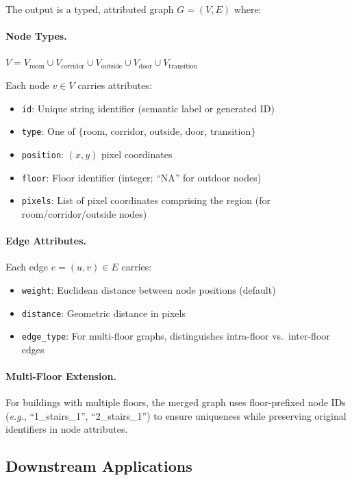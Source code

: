 \documentclass[manuscript,screen,review]{acmart}
\newcommand{\eg}{\textit{e.g.}}
\begin{document}
The output is a typed, attributed graph $G = (V, E)$ where:

\paragraph{Node Types.} $V = V_{\text{room}} \cup V_{\text{corridor}} \cup V_{\text{outside}} \cup V_{\text{door}} \cup V_{\text{transition}}$

Each node $v \in V$ carries attributes:
\begin{itemize}
    \item \texttt{id}: Unique string identifier (semantic label or generated ID)
    \item \texttt{type}: One of $\{$room, corridor, outside, door, transition$\}$
    \item \texttt{position}: $(x, y)$ pixel coordinates
    \item \texttt{floor}: Floor identifier (integer; ``NA'' for outdoor nodes)
    \item \texttt{pixels}: List of pixel coordinates comprising the region (for room/corridor/outside nodes)
\end{itemize}

\paragraph{Edge Attributes.} Each edge $e = (u, v) \in E$ carries:
\begin{itemize}
    \item \texttt{weight}: Euclidean distance between node positions (default)
    \item \texttt{distance}: Geometric distance in pixels
    \item \texttt{edge\_type}: For multi-floor graphs, distinguishes intra-floor vs.\ inter-floor edges
\end{itemize}

\paragraph{Multi-Floor Extension.} For buildings with multiple floors, the merged graph uses floor-prefixed node IDs (\eg, ``1\_stairs\_1'', ``2\_stairs\_1'') to ensure uniqueness while preserving original identifiers in node attributes.

\subsection{Downstream Applications}
\label{subsec:applications}
\end{document}
